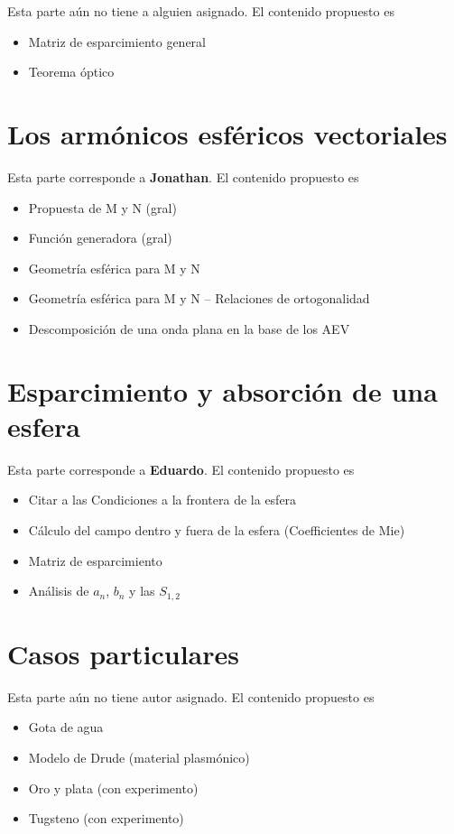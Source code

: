 \documentclass[12pts,a4paper]{book}
\begin{document}
Esta parte aún no tiene a alguien asignado. El contenido propuesto es

\begin{itemize}
 \item Matriz de esparcimiento general
 \item Teorema óptico
\end{itemize}



\chapter{Los armónicos esféricos vectoriales}
\label{ch:AEV} %
Esta parte corresponde a \textbf{Jonathan}. El contenido propuesto es

\begin{itemize}
 \item Propuesta de M y N (gral)
 \item Función generadora (gral)
 \item Geometría esférica para M y N
 \item Geometría esférica para M y N -- Relaciones de ortogonalidad
  \item Descomposición de una onda plana en la base de los AEV
\end{itemize}

\chapter{Esparcimiento y absorción de una esfera}
\label{ch:AEV} %
Esta parte corresponde a \textbf{Eduardo}. El contenido propuesto es

\begin{itemize}
 \item Citar a las Condiciones a la frontera de la esfera
 \item Cálculo del campo dentro y fuera de la esfera (Coefficientes de Mie)
 \item Matriz de esparcimiento
 \item Análisis de $a_n$, $b_n$ y las $S_{1,2}$
\end{itemize}

\chapter{Casos particulares}
\label{ch:AEV} %
Esta parte aún no tiene autor asignado. El contenido propuesto es

\begin{itemize}
 \item Gota de agua
 \item Modelo de Drude (material plasmónico)
 \item Oro y plata (con experimento)
 \item Tugsteno (con experimento)
\end{itemize}





\printindex
\end{document}

